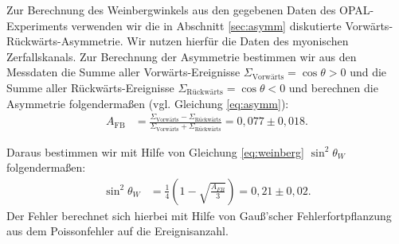 Zur Berechnung des Weinbergwinkels aus den gegebenen Daten des OPAL-Experiments verwenden wir die in Abschnitt \ref{sec:asymm} diskutierte Vorwärts-Rückwärts-Asymmetrie. Wir nutzen hierfür die Daten des myonischen Zerfallskanals. Zur Berechnung der Asymmetrie bestimmen wir aus den Messdaten die Summe aller Vorwärts-Ereignisse $\Sigma_\text{Vorwärts}=\cos\theta>0$ und die Summe aller Rückwärts-Ereignisse $\Sigma_\text{Rückwärts}=\cos\theta<0$ und berechnen die Asymmetrie folgendermaßen (vgl. Gleichung \ref{eq:asymm}):
\begin{align}
	A_\text{FB}&=\frac{\Sigma_\text{Vorwärts}-\Sigma_\text{Rückwärts}}{\Sigma_\text{Vorwärts}+\Sigma_\text{Rückwärts}}=0,077\pm0,018\text{.}
\end{align}

Daraus bestimmen wir mit Hilfe von Gleichung \ref{eq:weinberg} $\sin^2\theta_W$ folgendermaßen:
\begin{align}
	\sin^2\theta_W&=\frac14\left(1-\sqrt{\frac{A_{FB}}3}\right)=0,21\pm0,02\text{.}
\end{align}
Der Fehler berechnet sich hierbei mit Hilfe von Gauß'scher Fehlerfortpflanzung aus dem Poissonfehler auf die Ereignisanzahl.